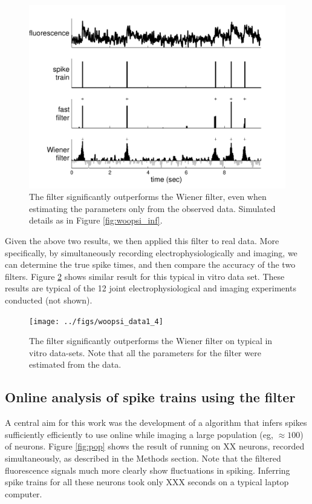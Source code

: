 \begin{figure}[h!]
\centering \includegraphics[width=.9\linewidth]{../figs/woopsi_learn}
\caption{The \foopsi filter significantly outperforms the Wiener filter, even when estimating the parameters only from the observed data.  Simulated details as in Figure \ref{fig:woopsi_inf}.} \label{fig:woopsi_learn}
\end{figure}

Given the above two results, we then applied this \foopsi filter to real data.  More specifically, by simultaneously recording electrophysiologically and imaging, we can determine the true spike times, and then compare the accuracy of the two filters.  Figure \ref{fig:woopsi_data} shows similar result for this typical in vitro data set.  These results are typical of the 12 joint electrophysiological and imaging experiments conducted (not shown).

\begin{figure}[h!]
\centering \texttt{[image: ../figs/woopsi\_data1\_4]}
\caption{The \foopsi filter significantly outperforms the Wiener filter on typical in vitro data-sets.  Note that all the parameters for the \foopsi filter were estimated from the data.} \label{fig:woopsi_data}
\end{figure}

\subsection{Online analysis of spike trains using the \foopsi filter}

A central aim for this work was the development of a algorithm that infers spikes sufficiently efficiently to use online while imaging a large population (eg, $\approx 100$) of neurons.  Figure \ref{fig:pop} shows the result of running \foopsi on XX neurons, recorded simultaneously, as described in the Methods section.  Note that the filtered fluorescence signals much more clearly show fluctuations in spiking.  Inferring spike trains for all these neurons took only XXX seconds on a typical laptop computer.


